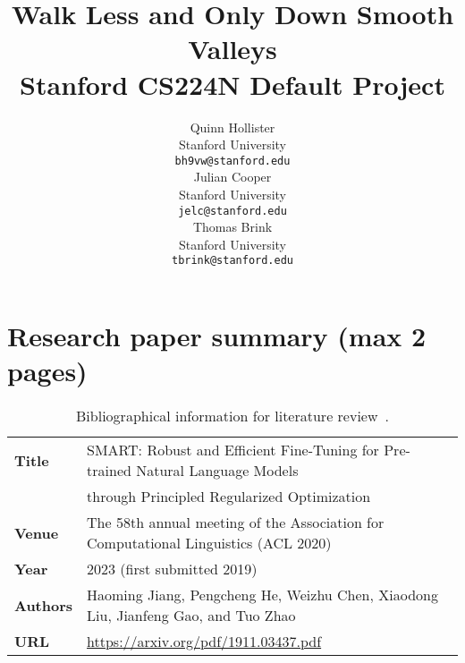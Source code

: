\documentclass{article}
\title{
  Walk Less and Only Down Smooth Valleys \\
  \vspace{0.15cm}
  \small{\normalfont Stanford CS224N Default Project}  %
}
\author{
  Quinn Hollister \\
  Stanford University \\
  \texttt{bh9vw@stanford.edu} \\
   \And
    Julian Cooper \\
  Stanford University \\
  \texttt{jelc@stanford.edu} \\
   \And
   Thomas Brink \\
  Stanford University \\
  \texttt{tbrink@stanford.edu} \\
}
\newcommand{\note}[1]{\textcolor{blue}{{#1}}}
\begin{document}
\maketitle


\vspace{-0.7cm}
\section{Research paper summary (max 2 pages)}
\begin{table}[h]
\footnotesize
    \centering
    \begin{tabular}{ll}
        \toprule
        \textbf{Title} & SMART: Robust and Efficient Fine-Tuning for Pre-trained
Natural Language Models \\
& through Principled Regularized
Optimization\\
        \midrule
        \textbf{Venue} & 	The 58th annual meeting of the Association for Computational Linguistics (ACL 2020) \\
        \textbf{Year}  & 2023 (first submitted 2019) \\
        \textbf{Authors} & Haoming Jiang, Pengcheng He, Weizhu Chen, Xiaodong Liu, Jianfeng Gao, and Tuo Zhao \\
        \textbf{URL} & \url{https://arxiv.org/pdf/1911.03437.pdf} \\
        \bottomrule
    \end{tabular}
    \vspace{1em}
    \caption{Bibliographical information for literature review~\cite{smart}.}
\end{table} 
\vspace{-0.35cm}

\end{document}
